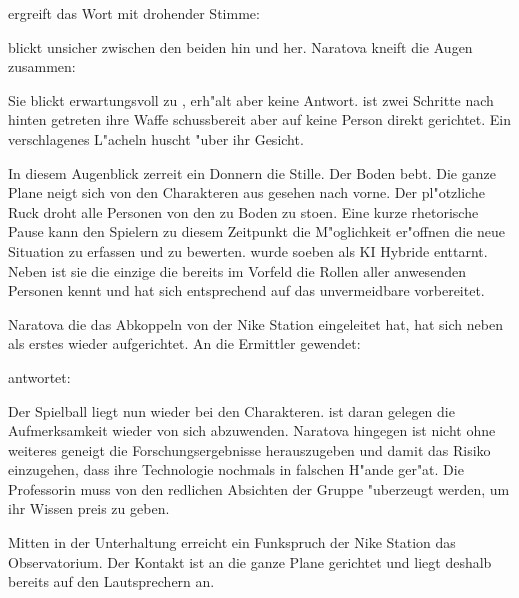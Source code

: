 \xl{} ergreift das Wort mit drohender Stimme:


\ml{} blickt unsicher zwischen den beiden hin und her. Naratova kneift die Augen zusammen:


Sie blickt erwartungsvoll zu \xl{}, erh"alt aber keine Antwort. \xl{} ist zwei Schritte nach hinten getreten ihre Waffe schussbereit aber auf keine Person direkt gerichtet. Ein verschlagenes L"acheln huscht "uber ihr Gesicht.

In diesem Augenblick zerrei\3t ein Donnern die Stille. Der Boden bebt. Die ganze Plane neigt sich von den Charakteren aus gesehen nach vorne. Der pl"otzliche Ruck droht alle Personen von den zu Boden zu sto\3en. Eine kurze rhetorische Pause kann den Spielern zu diesem Zeitpunkt die M"oglichkeit er"offnen die neue Situation zu erfassen und zu bewerten. \xl{} wurde soeben als KI Hybride enttarnt. Neben \ml{} ist sie die einzige die bereits im Vorfeld die Rollen aller anwesenden Personen kennt und hat sich entsprechend auf das unvermeidbare vorbereitet.

Naratova die das Abkoppeln von der Nike Station eingeleitet hat, hat sich neben \xl{} als erstes wieder aufgerichtet. An die Ermittler gewendet:


\xl{} antwortet:


Der Spielball liegt nun wieder bei den Charakteren. \xl{} ist daran gelegen die Aufmerksamkeit wieder von sich abzuwenden. Naratova hingegen ist nicht ohne weiteres geneigt die Forschungsergebnisse herauszugeben und damit das Risiko einzugehen, dass ihre Technologie nochmals in falschen H"ande ger"at. Die Professorin muss von den redlichen Absichten der Gruppe "uberzeugt werden, um ihr Wissen preis zu geben.

Mitten in der Unterhaltung erreicht ein Funkspruch der Nike Station das Observatorium. Der Kontakt ist an die ganze Plane gerichtet und liegt deshalb bereits auf den Lautsprechern an.

